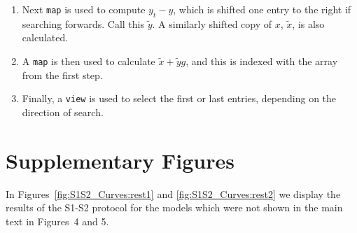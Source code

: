 \documentclass[preprint,authoryear,12pt]{elsarticle}
\newcommand{\code}[1]{\texttt{#1}}
\begin{document}
\begin{description}
\begin{enumerate}
  \item
    Next \code{map} is used to compute $y_t - y$, which is shifted one entry to the right if searching forwards.
    Call this $\tilde{y}$.
    A similarly shifted copy of $x$, $\tilde{x}$, is also calculated.
  \item
    A \code{map} is then used to calculate $\tilde{x} + \tilde{y} g$, and this is indexed with the array from the first step.
  \item
    Finally, a \code{view} is used to select the first or last entries, depending on the direction of search.
  \end{enumerate}

\end{description}


\section{Supplementary Figures}
\label{supp:figures}

In Figures~\ref{fig:S1S2_Curves:rest1} and \ref{fig:S1S2_Curves:rest2} we display the results of the S1-S2 protocol for the models which were not shown in the main text in Figures~4 and 5.
\end{document}
